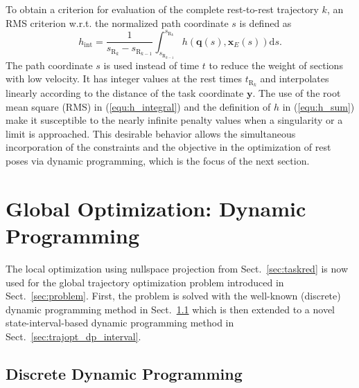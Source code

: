 \documentclass[runningheads]{llncs}
\newcommand{\bm}[1]{\boldsymbol{#1}}
\renewcommand{\vec}[1]{\boldsymbol{#1}}
\begin{document}
To obtain a criterion for evaluation of the complete rest-to-rest trajectory $k$, an RMS criterion w.r.t. the normalized path coordinate $s$ is defined as
%
\begin{equation}
h_\mathrm{int} =
\frac{1}{s_{\mathrm{R}_k}-s_{\mathrm{R}_{k-1}}}
\int_{s_{\mathrm{R}_{k-1}}}^{s_{\mathrm{R}_{k}}}
h(\vec{q}(s), \vec{x}_E(s))
\mathrm{d}s.
\label{equ:h_integral}
\end{equation}
%
The path coordinate $s$ is used instead of time $t$ to reduce the weight of sections with low velocity.
It has integer values at the rest times $t_{\mathrm{R}_{k}}$ and interpolates linearly according to the distance of the task coordinate $\bm{y}$.
The use of the root mean square (RMS) in (\ref{equ:h_integral}) and the definition of $h$ in (\ref{equ:h_sum}) make it susceptible to the nearly infinite penalty values when a singularity or a limit is approached.
This desirable behavior allows the simultaneous incorporation of the constraints and the objective in the optimization of rest poses via dynamic programming, which is the focus of the next section.

\section{Global Optimization: Dynamic Programming}
\label{sec:trajopt}

The local optimization using nullspace projection from Sect.~\ref{sec:taskred} is now used for the global trajectory optimization problem introduced in Sect.~\ref{sec:problem}.
%
First, the problem is solved with the well-known (discrete) dynamic programming method in Sect.~\ref{sec:trajopt_dp_discr} which is then extended to a novel state-interval-based dynamic programming method in Sect.~\ref{sec:trajopt_dp_interval}.

\subsection{Discrete Dynamic Programming}
\label{sec:trajopt_dp_discr}
\end{document}
